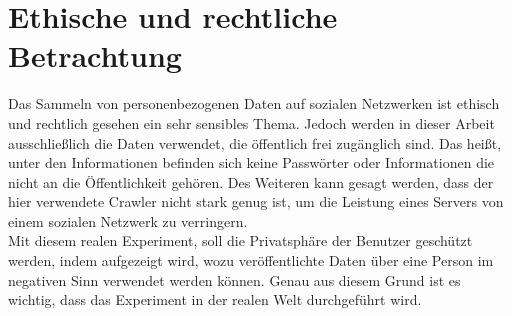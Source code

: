 \chapter{Ethische und rechtliche Betrachtung}  %
\label{cha:EthischeUndRechtlicheBetrachtung} %
Das Sammeln von personenbezogenen Daten auf sozialen Netzwerken ist ethisch und rechtlich gesehen ein sehr sensibles Thema. Jedoch werden in dieser Arbeit ausschließlich die Daten verwendet, die öffentlich frei zugänglich sind. Das heißt, unter den Informationen befinden sich keine Passwörter oder Informationen die nicht an die Öffentlichkeit gehören. Des Weiteren kann gesagt werden, dass der hier verwendete Crawler nicht stark genug ist, um die Leistung eines Servers von einem sozialen Netzwerk zu verringern.\\
Mit diesem realen Experiment, soll die Privatsphäre der Benutzer geschützt werden, indem aufgezeigt wird, wozu veröffentlichte Daten über eine Person im negativen Sinn verwendet werden können. Genau aus diesem Grund ist es wichtig, dass das Experiment in der realen Welt durchgeführt wird.\\

